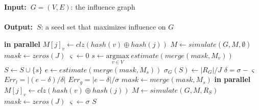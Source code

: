 \documentclass[10pt,journal,compsoc]{IEEEtran}
\renewcommand{\algorithmicrequire}{\textbf{Input:~}}
\renewcommand{\algorithmicensure}{\textbf{Output:~}}
\newcommand\acro{{\sc{HyperFuseR\xspace}\xspace}\xspace}
\begin{document}
\begin{algorithm}
\caption{\sc{\acro}($G,K,J$)}
\label{algo:main}
\algorithmicrequire{$G = (V,E)$: the influence graph
\\\\}
\algorithmicensure{$S$: a seed set that maximizes influence on $G$
}
\begin{algorithmic}[1]
     {\bf in parallel}
            \State $M[j]_v \leftarrow clz(hash(v) \oplus hash(j))$ 
        \EndFor
    \EndFor
    \State $M \leftarrow simulate(G,M,\emptyset)$
    \State $mask \leftarrow zeros(J)$
    \State $\varsigma \leftarrow 0$
        \State $s \leftarrow \underset{v\in V}{\mathrm{argmax}} ~estimate(merge(mask,M_v))$
        \State $S \leftarrow S \cup \{s\}$
        \State $e \leftarrow estimate(merge(mask,M_s))$
        \State $\sigma_G(S) \leftarrow |R_{G}|/J$
        \State $\delta = \sigma - \varsigma$
        \State $Err_l=|(e - \delta) / \delta|$
        \State $Err_g=|e-\delta| / \sigma $
            \State $mask \leftarrow merge(mask,M_s)$
        \Else
             {\bf in parallel}
                    \State $M[j]_v \leftarrow clz(hash(v) \oplus hash(j))$ 
                \EndFor
            \EndFor
            \State $M \leftarrow simulate(G,M,R_S)$
            \State $mask \leftarrow zeros(J) $ 
            \State $\varsigma \leftarrow \sigma $ 
        \EndIf
    \EndFor
    \State \Return $S$
\end{algorithmic}
\end{algorithm}
\end{document}
